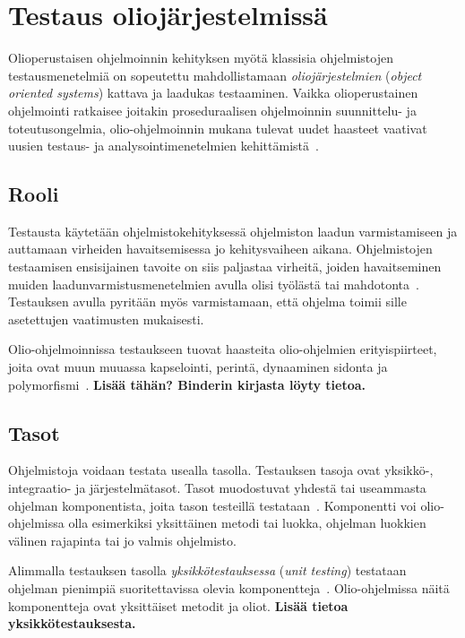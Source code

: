 \documentclass[finnish, grading]{tktltiki2}
\theoremstyle{definition}
\theoremstyle{remark}
\begin{document}


\section{Testaus oliojärjestelmissä}

Olioperustaisen ohjelmoinnin kehityksen myötä klassisia ohjelmistojen testausmenetelmiä on sopeutettu mahdollistamaan \textit{oliojärjestelmien} (\textit{object oriented systems}) kattava ja laadukas testaaminen. Vaikka olioperustainen ohjelmointi ratkaisee joitakin proseduraalisen ohjelmoinnin suunnittelu- ja toteutusongelmia, olio-ohjelmoinnin mukana tulevat uudet haasteet vaativat uusien testaus- ja analysointimenetelmien kehittämistä~\cite[s. 86]{Mariani:Pezze:2008}. 

\subsection{Rooli}

Testausta käytetään ohjelmistokehityksessä ohjelmiston laadun varmistamiseen ja auttamaan virheiden havaitsemisessa jo kehitysvaiheen aikana. Ohjelmistojen testaamisen ensisijainen tavoite on siis paljastaa virheitä, joiden havaitseminen muiden laadunvarmistusmenetelmien avulla olisi työlästä tai mahdotonta~\cite[s. 59]{Binder:1999}. Testauksen avulla pyritään myös varmistamaan, että ohjelma toimii sille asetettujen vaatimusten mukaisesti. 

Olio-ohjelmoinnissa testaukseen tuovat haasteita olio-ohjelmien erityispiirteet, joita ovat muun muuassa kapselointi, perintä, dynaaminen sidonta ja polymorfismi~\cite[s. 86]{Mariani:Pezze:2008}. 
\textbf{Lisää tähän? Binderin kirjasta löyty tietoa.}


\subsection{Tasot}

Ohjelmistoja voidaan testata usealla tasolla. Testauksen tasoja ovat yksikkö-, integraatio- ja järjestelmätasot. Tasot muodostuvat yhdestä tai useammasta ohjelman komponentista, joita tason testeillä testataan~\cite[s. 45]{Binder:1999}. Komponentti voi olio-ohjelmissa olla esimerkiksi yksittäinen metodi tai luokka, ohjelman luokkien välinen rajapinta tai jo valmis ohjelmisto.

Alimmalla testauksen tasolla \textit{yksikkötestauksessa} (\textit{unit testing}) testataan ohjelman pienimpiä suoritettavissa olevia komponentteja~\cite[s. 45]{Binder:1999}. Olio-ohjelmissa näitä komponentteja ovat yksittäiset metodit ja oliot. 
\textbf{Lisää tietoa yksikkötestauksesta.}
\end{document}
